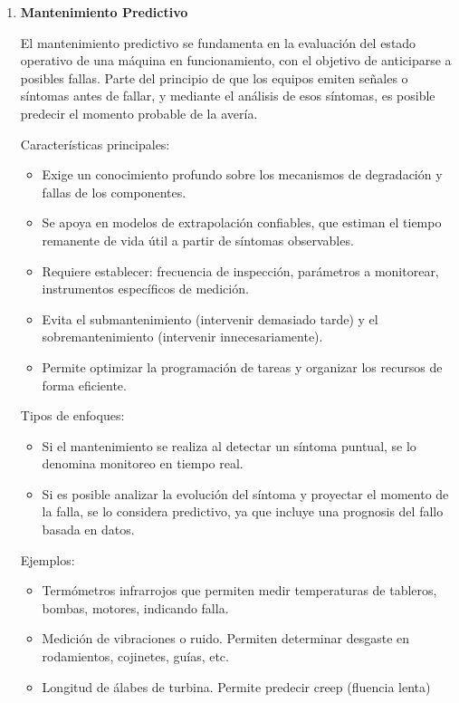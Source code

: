 \documentclass[a4paper,oneside,11pt]{article}
\begin{document}
\begin{enumerate}
    
    \item \textbf{Mantenimiento Predictivo}

    El mantenimiento predictivo se fundamenta en la evaluación del estado operativo de una máquina en funcionamiento, con el objetivo de anticiparse a posibles fallas. Parte del principio de que los equipos emiten señales o síntomas antes de fallar, y mediante el análisis de esos síntomas, es posible predecir el momento probable de la avería.

    Características principales:
    \begin{itemize}
        \item Exige un conocimiento profundo sobre los mecanismos de degradación y fallas de los componentes.
        \item Se apoya en modelos de extrapolación confiables, que estiman el tiempo remanente de vida útil a partir de síntomas observables.
        \item Requiere establecer: frecuencia de inspección, parámetros a monitorear, instrumentos específicos de medición.
        \item Evita el submantenimiento (intervenir demasiado tarde) y el sobremantenimiento (intervenir innecesariamente).
        \item Permite optimizar la programación de tareas y organizar los recursos de forma eficiente.
    \end{itemize}

    Tipos de enfoques: 
    \begin{itemize}
        \item Si el mantenimiento se realiza al detectar un síntoma puntual, se lo denomina monitoreo en tiempo real.
        \item Si es posible analizar la evolución del síntoma y proyectar el momento de la falla, se lo considera predictivo, ya que incluye una prognosis del fallo basada en datos.
    \end{itemize}

    Ejemplos: 
    \begin{itemize}
        \item Termómetros infrarrojos que permiten medir temperaturas de tableros, bombas, motores, indicando falla.
        \item Medición de vibraciones o ruido. Permiten determinar desgaste en rodamientos, cojinetes, guías, etc.
        \item Longitud de álabes de turbina. Permite predecir creep (fluencia lenta)
    \end{itemize}

\end{enumerate}
\end{document}
